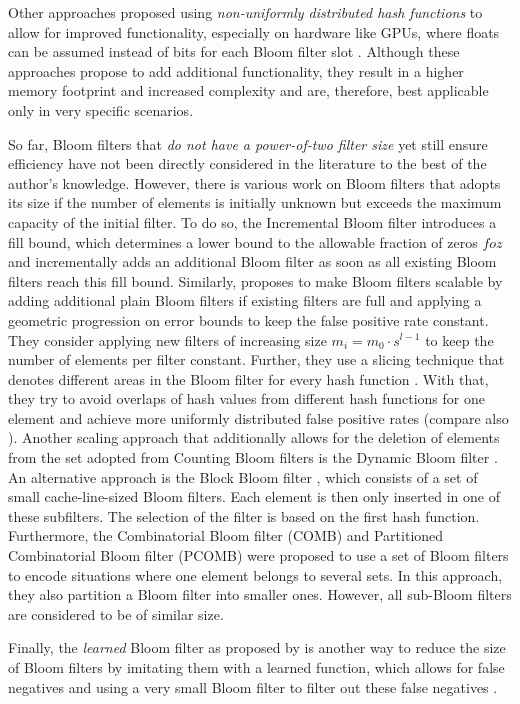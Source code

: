 Other approaches proposed using \textit{non-uniformly distributed hash functions} to allow for improved functionality, especially on hardware like GPUs, where floats can be assumed instead of bits for each Bloom filter slot \cite{Werner.2015b}. Although these approaches propose to add additional functionality, they result in a higher memory footprint and increased complexity and are, therefore, best applicable only in very specific scenarios.

So far, Bloom filters that \textit{do not have a power-of-two filter size} yet still ensure efficiency have not been directly considered in the literature to the best of the author's knowledge. 
However, there is various work on Bloom filters that adopts its size if the number of elements is initially unknown but exceeds the maximum capacity of the initial filter. To do so, the Incremental Bloom filter \cite{Hao.2008} introduces a fill bound, which determines a lower bound to the allowable fraction of zeros $\mathit{foz}$ and incrementally adds an additional Bloom filter as soon as all existing Bloom filters reach this fill bound. Similarly, \cite{Almeida.2007} proposes to make Bloom filters scalable by adding additional plain Bloom filters if existing filters are full and applying a geometric progression on error bounds to keep the false positive rate constant. They consider applying new filters of increasing size $m_i=m_0\cdot s^{l-1}$ to keep the number of elements per filter constant. Further, they use a slicing technique that denotes different areas in the Bloom filter for every hash function \cite{Chang.2004, Almeida.2007}. With that, they try to avoid overlaps of hash values from different hash functions for one element and achieve more uniformly distributed false positive 
rates (compare also \cite{Bose.2008}). Another scaling approach that additionally allows for the deletion of elements from the set adopted from Counting Bloom filters \cite{Fan.1998, Bonomi.2006} is the Dynamic Bloom filter \cite{Guo.2010}. 
An alternative approach is the Block Bloom filter \cite{Putze.2009}, which consists of a set of small cache-line-sized Bloom filters. Each element is then only inserted in one of these subfilters. The selection of the filter is based on the first hash function. 
Furthermore, the Combinatorial Bloom filter (COMB) and Partitioned Combinatorial Bloom filter  (PCOMB) \cite{Hao.2009} were proposed to use a set of Bloom filters to encode situations where one element belongs to several sets. In this approach, they also partition a Bloom filter into smaller ones. However, all sub-Bloom filters are considered to be of similar size. 

Finally, the \textit{learned} Bloom filter as proposed by \citeauthor{Mitzenmacher.2018} is another way to reduce the size of Bloom filters by imitating them with a learned function, which allows for false negatives and using a very small Bloom filter to filter out these false negatives \cite{Mitzenmacher.2018}.